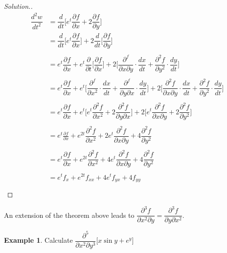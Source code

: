 \documentclass[11pt,a4paper]{article}
\theoremstyle{definition}
\newtheorem{exa}[thm]{Example}
\newenvironment{solution}
  {\renewcommand{\qedsymbol}{}\begin{proof}[\textit{Solution}.]}
  {\end{proof}}
\begin{document}
\begin{solution}
\begin{align*}
\dfrac{d^2w}{dt^2} & = \dfrac{d}{dt}\Bigg[ e^t\dfrac{\partial f}{\partial x} + 2\dfrac{\partial f}{\partial y}\Bigg]\\
& = \dfrac{d}{dt}\Bigg[ e^t\dfrac{\partial f}{\partial x}\Bigg]  +  2\dfrac{d}{dt}\Bigg[\dfrac{\partial f}{\partial y}\Bigg]\\\\
& = e^t\dfrac{\partial f}{\partial x} + e^t\dfrac{\partial}{\partial t}\Bigg[\dfrac{\partial f}{\partial x}\Bigg] + 2 \Bigg[\dfrac{\partial^f}{\partial x\partial y}\cdot\dfrac{dx}{dt} + \dfrac{\partial^2f}{\partial y^2}\cdot\dfrac{dy}{dt}\Bigg]\\\\
& = e^t\dfrac{\partial f}{\partial x} + e^t \Bigg[\dfrac{\partial^f}{\partial x^2}\cdot\dfrac{dx}{dt} + \dfrac{\partial^f}{\partial y \partial x}\cdot\dfrac{dy}{dt}\Bigg] + 2 \Bigg[\dfrac{\partial^2f}{\partial x\partial y}\cdot\dfrac{dx}{dt} + \dfrac{\partial^2f}{\partial y^2}\cdot \dfrac{dy}{dt}\Bigg]\\\\
& = e^t\dfrac{\partial f}{\partial x} + e^t\Bigg[e^t\dfrac{\partial^2f}{\partial x^2} + 2\dfrac{\partial^2f}{\partial y \partial x}\Bigg] + 2\Bigg[e^t\dfrac{\partial^2f}{\partial x\partial y} + 2 \dfrac{\partial^2f}{\partial y^2}\Bigg]\\\\
& = e^t\frac{\partial f}{\partial x} + e^{2t}\dfrac{\partial^2f}{\partial x^2} + 2e^t\dfrac{\partial^2f}{\partial x\partial y} + 4\dfrac{\partial^2f}{\partial y^2}\\\\
& = e^t\dfrac{\partial f}{\partial x} + e^{2t}\dfrac{\partial^2f}{\partial x^2} + 4e^t\dfrac{\partial^2f}{\partial x \partial y} + 4\dfrac{\partial^2f}{\partial y^2}\\\\
& = e^tf_x + e^{2t}f_{xx} + 4e^{t}f_{yx} + 4f_{yy}\\\\
\end{align*}
\end{solution}

An extension of the theorem above leads to $\dfrac{\partial^3f}{\partial x^2 \partial y} = \dfrac{\partial^3f}{\partial y \partial x^2}$.


\begin{exa}


Calculate $\dfrac{\partial^5}{\partial x^2\partial y^3}\big[x\sin y + e^y\big]$
\end{exa}
\end{document}
